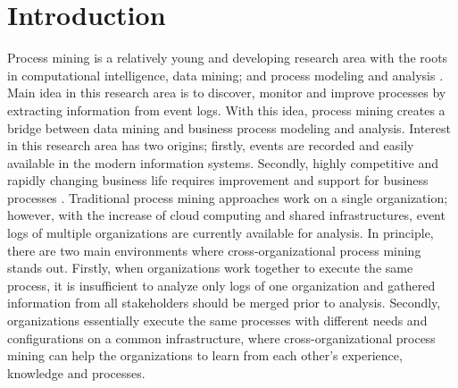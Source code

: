\section{Introduction}\label{sec:intro}
Process mining is a relatively young and developing research area with the roots in computational intelligence, data mining; and process modeling and analysis \cite{van2012process}. Main idea in this research area is to discover, monitor and improve processes by extracting information from event logs. With this idea, process mining creates a bridge between data mining and business process modeling and analysis. Interest in this research area has two origins; firstly, events are recorded and easily available in the modern information systems. Secondly, highly competitive and rapidly changing business life requires improvement and support for business processes \cite{van2012process}. Traditional process mining approaches work on a single organization; however, with the increase of cloud computing and shared infrastructures, event logs of multiple organizations are currently available for analysis. In principle, there are two main environments where cross-organizational process mining stands out. Firstly, when organizations work together to execute the same process, it is insufficient to analyze only logs of one organization and gathered information from all stakeholders should be merged prior to analysis. Secondly, organizations essentially execute the same processes with different needs and configurations on a common infrastructure, where cross-organizational process mining can help the organizations to learn from each other's experience, knowledge and processes.

